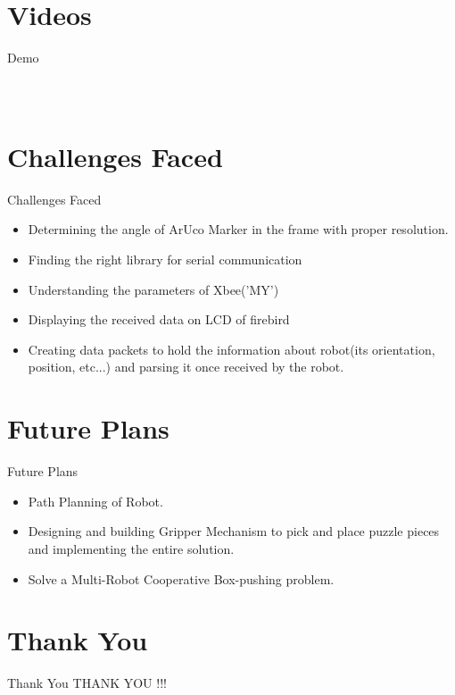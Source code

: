 \documentclass[10pt,a4paper]{beamer}
\begin{document}
\section{Videos}
\begin{frame}{Demo}
\begin{columns}
\begin{figure}

\end{figure}
\begin{figure}

\end{figure}

\end{columns}

\end{frame}

\section{Challenges Faced}
\begin{frame}{Challenges Faced}
	\begin{itemize}
		\item Determining the angle of ArUco Marker in the frame with proper resolution.\pause
		\item Finding the right library for serial communication\pause
		\item Understanding the parameters of Xbee('MY')\pause
		\item Displaying the received data on LCD of firebird\pause
		\item Creating data packets to hold the information about robot(its orientation, position, etc...) and parsing it once received by the robot.
	\end{itemize}
\end{frame}

\section{Future Plans}
\begin{frame}{Future Plans}
	\begin{itemize}
		\item Path Planning of Robot.\pause
		\item Designing and building Gripper Mechanism to pick and place puzzle pieces and implementing the entire solution.\pause
		\item Solve a Multi-Robot Cooperative Box-pushing problem.
	\end{itemize}
\end{frame}


\section{Thank You}
\begin{frame}{Thank You}
	\centering THANK YOU !!!
\end{frame}
\end{document}
